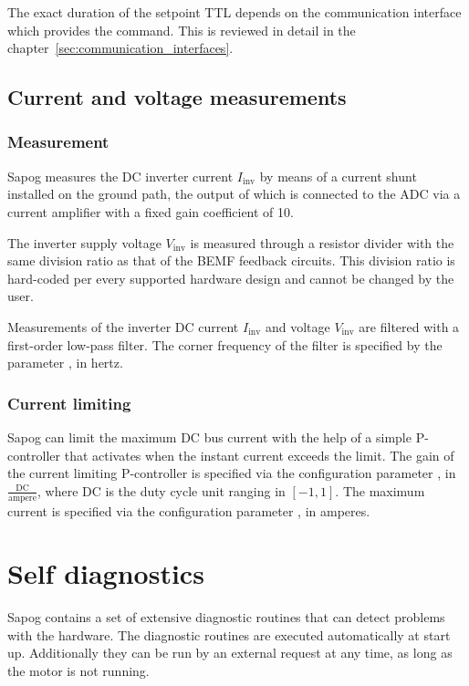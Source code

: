 \documentclass{zubaxdoc}
\begin{document}
	The exact duration of the setpoint TTL depends on the communication interface which provides the command.
	This is reviewed in detail in the chapter~\ref{sec:communication_interfaces}.
	
	\subsection{Current and voltage measurements}
	
	\subsubsection{Measurement}
	
	Sapog measures the DC inverter current $I_\text{inv}$ by means of a current shunt installed on the ground path,
	the output of which is connected to the ADC via a current amplifier with a fixed gain coefficient of 10.
	
	The inverter supply voltage $V_\text{inv}$ is measured through a resistor divider with the same
	division ratio as that of the BEMF feedback circuits.
	This division ratio is hard-coded per every supported hardware design and cannot be changed by the user.
	
	Measurements of the inverter DC current $I_\text{inv}$ and voltage $V_\text{inv}$
	are filtered with a first-order low-pass filter.
	The corner frequency of the filter is specified by the parameter , in hertz.
	
	\subsubsection{Current limiting}\label{sec:current_limiting}
	
	Sapog can limit the maximum DC bus current with the help of a simple P-controller
	that activates when the instant current exceeds the limit.
	The gain of the current limiting P-controller is specified via the configuration parameter
	, in $\frac{\text{DC}}{\text{ampere}}$, where $\text{DC}$ is the duty cycle unit
	ranging in $\left[-1, 1\right]$.
	The maximum current is specified via the configuration parameter , in amperes.
	
	\section{Self diagnostics}\label{sec:self_diagnostics}
	
	Sapog contains a set of extensive diagnostic routines that can detect problems with the hardware.
	The diagnostic routines are executed automatically at start up.
	Additionally they can be run by an external request at any time, as long as the motor is not running.
	
\end{document}
